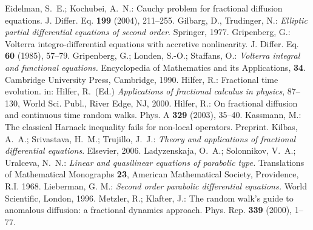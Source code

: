 \documentclass[10pt]{article}
\begin{document}
\begin{thebibliography}{99}
{ Eidelman, S.\ E.; Kochubei, A.\ N.: Cauchy problem for
fractional diffusion equations. J. Differ. Eq. {\bf 199} (2004),
211--255.
 Gilbarg, D., Trudinger, N.: {\em Elliptic
partial differential equations of second order}. Springer, 1977.
 Gripenberg, G.: Volterra integro-differential
equations with accretive nonlinearity. J. Differ. Eq. {\bf 60}
(1985), 57--79.
 Gripenberg, G.; Londen, S.-O.; Staffans, O.:
{\em Volterra integral and functional equations.} Encyclopedia of
Mathematics and its Applications, {\bf 34}. Cambridge University
Press, Cambridge, 1990.
 Hilfer, R.: Fractional time evolution. in: Hilfer, R.\ (Ed.) {\em Applications of fractional
calculus in physics},  87--130, World Sci. Publ., River Edge, NJ,
2000.
 Hilfer, R.: On fractional diffusion and continuous time random
walks. Phys. A  {\bf 329} (2003), 35--40.
 Kassmann, M.: The classical Harnack inequality fails
for non-local operators. Preprint.
 Kilbas, A.\ A.; Srivastava, H.\ M.; Trujillo, J.\ J.:
{\em Theory and applications of fractional differential equations}.
Elsevier, 2006.
Ladyzenskaja, O.\ A.; Solonnikov, V.\ A.; Uralceva, N.\ N.: {\em
Linear and quasilinear equations of parabolic type.} Translations of
Mathematical Monographs {\bf 23}, American Mathematical Society,
Providence, R.I. 1968.
 Lieberman, G. M.: {\em Second order parabolic
differential equations.} World Scientific, London, 1996.
 Metzler, R.; Klafter, J.: The random walk's guide to
anomalous diffusion: a fractional dynamics approach. Phys. Rep. {\bf
339} (2000), 1--77.
}
\end{thebibliography}
\end{document}
